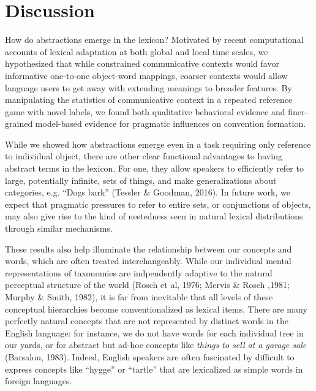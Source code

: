 \documentclass[10pt,letterpaper]{article}
\begin{document}
\section{Discussion}

How do abstractions emerge in the lexicon? Motivated by recent computational accounts of lexical adaptation at both global and local time scales, we hypothesized that while constrained communicative contexts would favor informative one-to-one object-word mappings, coarser contexts would allow language users to get away with extending meanings to broader features. By manipulating the statistics of communicative context in a repeated reference game with novel labels, we found both qualitative behavioral evidence and finer-grained model-based evidence for pragmatic influences on convention formation.


While we showed how abstractions emerge even in a task requiring only reference to individual object, there are other clear functional advantages to having abstract terms in the lexicon. For one, they allow speakers to efficiently refer to large, potentially infinite, sets of things, and make generalizations about categories, e.g. ``Dogs bark'' (Tessler \& Goodman, 2016). In future work, we expect that pragmatic pressures to refer to entire sets, or conjunctions of objects, may also give rise to the kind of nestedness seen in natural lexical distributions through similar mechanisms.

These results also help illuminate the relationship between our concepts and words, which are often treated interchangeably. While our individual mental representations of taxonomies are indpendently adaptive to the natural perceptual structure of the world (Rosch et al, 1976; Mervis \& Rosch ,1981; Murphy \& Smith, 1982), it is far from inevitable that all levels of these conceptual hierarchies become conventionalized as lexical items. There are many perfectly natural concepts that are not represented by distinct words in the English language: for instance, we do not have words for each individual tree in our yards, or for abstract but ad-hoc concepts like \emph{things to sell at a garage sale} (Barsalou, 1983). Indeed, English speakers are often fascinated by difficult to express concepts like ``hygge'' or ``tartle'' that are lexicalized as simple words in foreign languages.

\end{document}
